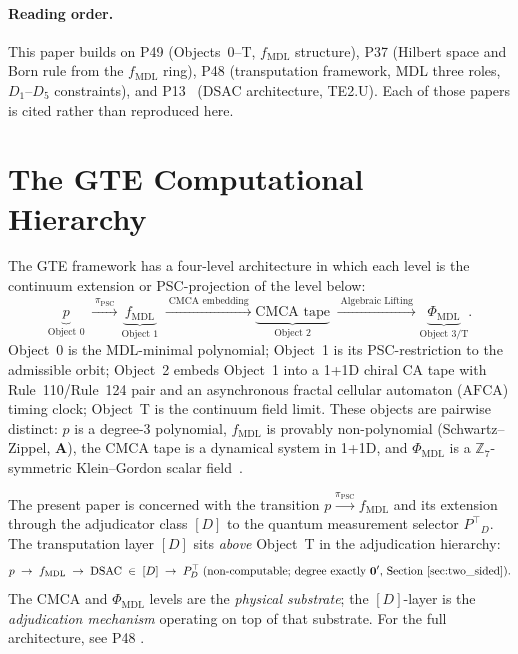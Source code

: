 \documentclass[11pt]{article}
\theoremstyle{remark}
\newcommand{\PSC}{\text{PSC}}
\newcommand{\PHIMDL}{\ensuremath{\Phi_{\mathrm{MDL}}}}
\newcommand{\ZS}{\ensuremath{\mathbb{Z}_7}}
\newcommand{\AFCA}{\text{AFCA}}
\newcommand{\fmdl}{\ensuremath{f_{\mathrm{MDL}}}}
\newcommand{\DSAC}{\text{DSAC}}
\newcommand{\Ptop}{\ensuremath{P^{\top}}}
\newcommand{\CatA}{\textbf{A}}
\begin{document}
\paragraph{Reading order.}
This paper builds on P49 (Objects~0--T, $\fmdl{}$ structure),
P37 (Hilbert space and Born rule from the \fmdl{} ring),
P48 (transputation framework, MDL three roles, $D_1$--$D_5$ constraints),
and P13~\cite{SpivackMFRR} (DSAC architecture, TE2.U). Each
of those papers is cited rather than reproduced here.


\section{The GTE Computational Hierarchy}
\label{sec:hierarchy}

The GTE framework has a four-level architecture in which each level is the
continuum extension or PSC-projection of the level below:
\begin{equation}
\underbrace{p}_{\text{Object~0}}
\;\xrightarrow{\;\pi_{\PSC}\;}
\underbrace{\fmdl{}}_{\text{Object~1}}
\;\xrightarrow{\;\text{CMCA embedding}\;}
\underbrace{\text{CMCA tape}}_{\text{Object~2}}
\;\xrightarrow{\;\text{Algebraic Lifting}\;}
\underbrace{\PHIMDL}_{\text{Object~3/T}}.
\label{eq:hierarchy}
\end{equation}
Object~0 is the MDL-minimal polynomial; Object~1 is its PSC-restriction to
the admissible orbit; Object~2 embeds Object~1 into a 1+1D chiral CA tape
with Rule~110/Rule~124 pair and an asynchronous fractal cellular automaton
($\AFCA$) timing clock; Object~T is the continuum field limit.
These objects are pairwise distinct: $p$ is a degree-3 polynomial, $\fmdl{}$
is provably non-polynomial (Schwartz--Zippel, \CatA), the CMCA tape is a
dynamical system in 1+1D, and $\PHIMDL$ is a $\ZS$-symmetric Klein--Gordon
scalar field~\cite{SpivackGTEPolynomialWolfram,SpivackCMCA,SpivackThreeTapeCMCA}.

The present paper is concerned with the transition
$p \xrightarrow{\pi_{\PSC}} \fmdl{}$ and its extension through the adjudicator
class $[D]$ to the quantum measurement selector $\Ptop_D$.
The transputation layer $[D]$ sits \emph{above} Object~T in the adjudication
hierarchy:
\begin{equation}
p \;\to\; \fmdl{}
\;\to\; \DSAC \;\in\; [D]
\;\to\; \Ptop_D \;\text{(non-computable; degree exactly $\mathbf{0}'$,
Section~\ref{sec:two_sided})}.
\label{eq:adjudicator_chain}
\end{equation}
The CMCA and $\PHIMDL$ levels are the \emph{physical substrate}; the
$[D]$-layer is the \emph{adjudication mechanism} operating on top of that
substrate. For the full architecture, see P48 \cite{SpivackGTECompleteFramework}.
\end{document}
